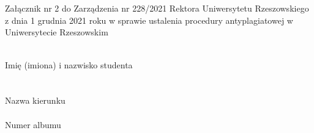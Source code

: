 \chapter*{}
\label{cha:statement-A}
\makeatletter
{}

\noindent
\begin{flushright}
    \begin{minipage}[!h]{10cm}
        Załącznik nr 2 do Zarządzenia nr 228/2021 Rektora Uniwersytetu Rzeszowskiego z dnia 1 grudnia 2021 roku w sprawie ustalenia procedury antyplagiatowej w Uniwersytecie Rzeszowskim
    \end{minipage}
\end{flushright}

\begin{center}
    \vspace*{10mm}
    \vspace*{10mm}
\end{center}

\noindent
\dotuline{\hspace{1.3cm}\@author\hspace{1.3cm}}\\ %
{\small Imię (imiona) i nazwisko studenta }\\

\noindent \@faculty\\

\noindent \dotuline{\hspace{1.4cm}\@degreeprogramme \hspace{1.4cm}}\\
{\small Nazwa kierunku} \\

\noindent \dotuline{\hspace{1.8cm}\@noAlbum\hspace{1.9cm}}\\
{\small Numer albumu}

